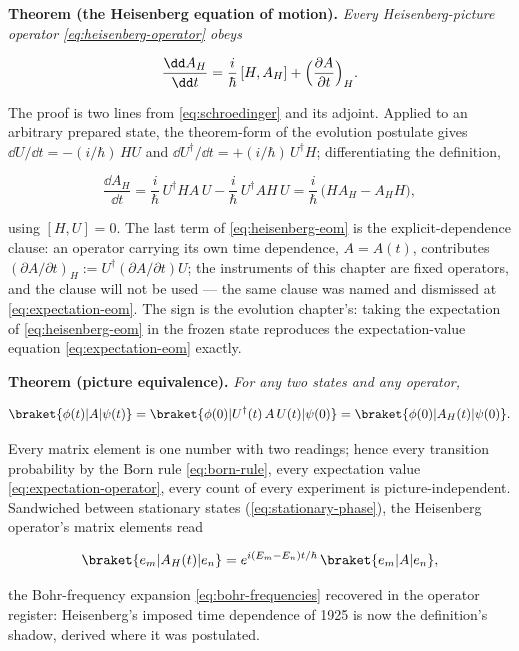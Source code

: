 \medskip\noindent\textbf{Theorem (the Heisenberg equation of motion).} \emph{Every Heisenberg-picture operator \eqref{eq:heisenberg-operator} obeys}
\begin{linenomath}
    \begin{equation}
        \frac{\dd A_H}{\dd t} = \frac{i}{\hbar}\,[H, A_H] + \Bigl(\frac{\partial A}{\partial t}\Bigr)_H .
        \label{eq:heisenberg-eom}
    \end{equation}
\end{linenomath}
The proof is two lines from \eqref{eq:schroedinger} and its adjoint. Applied to an arbitrary prepared state, the theorem-form of the evolution postulate gives $\dd U/\dd t = -(i/\hbar)\,HU$ and $\dd U^\dagger/\dd t = +(i/\hbar)\,U^\dagger H$; differentiating the definition,
\begin{linenomath}
    \begin{equation*}
        \frac{\dd A_H}{\dd t} = \frac{i}{\hbar}\,U^\dagger H A\,U - \frac{i}{\hbar}\,U^\dagger A H\,U = \frac{i}{\hbar}\,\bigl(HA_H - A_HH\bigr),
    \end{equation*}
\end{linenomath}
using $[H, U] = 0$. The last term of \eqref{eq:heisenberg-eom} is the explicit-dependence clause: an operator carrying its own time dependence, $A = A(t)$, contributes $(\partial A/\partial t)_H := U^\dagger(\partial A/\partial t)U$; the instruments of this chapter are fixed operators, and the clause will not be used --- the same clause was named and dismissed at \eqref{eq:expectation-eom}. The sign is the evolution chapter's: taking the expectation of \eqref{eq:heisenberg-eom} in the frozen state reproduces the expectation-value equation \eqref{eq:expectation-eom} exactly.

\medskip\noindent\textbf{Theorem (picture equivalence).} \emph{For any two states and any operator,}
\begin{linenomath}
    \begin{equation}
        \braket{\phi(t)|A|\psi(t)} = \braket{\phi(0)|U^\dagger(t)\,A\,U(t)|\psi(0)} = \braket{\phi(0)|A_H(t)|\psi(0)} .
        \label{eq:picture-invariance}
    \end{equation}
\end{linenomath}
Every matrix element is one number with two readings; hence every transition probability by the Born rule \eqref{eq:born-rule}, every expectation value \eqref{eq:expectation-operator}, every count of every experiment is picture-independent. Sandwiched between stationary states (\eqref{eq:stationary-phase}), the Heisenberg operator's matrix elements read
\begin{linenomath}
    \begin{equation*}
        \braket{e_m|A_H(t)|e_n} = e^{i(E_m - E_n)t/\hbar}\,\braket{e_m|A|e_n},
    \end{equation*}
\end{linenomath}
the Bohr-frequency expansion \eqref{eq:bohr-frequencies} recovered in the operator register: Heisenberg's imposed time dependence of 1925 is now the definition's shadow, derived where it was postulated.

